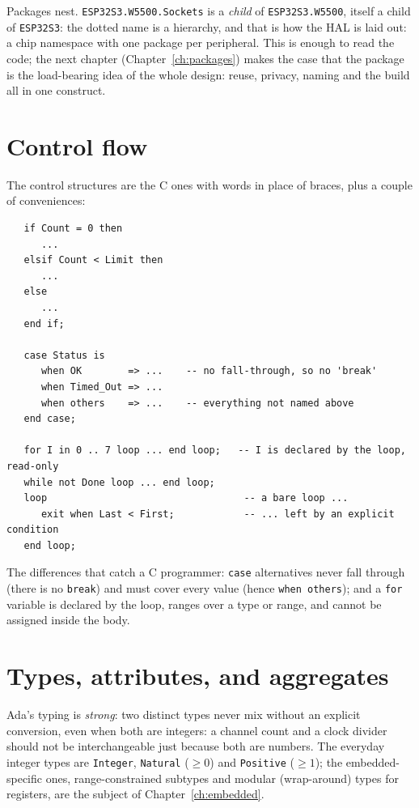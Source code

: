 Packages nest. \texttt{ESP32S3.W5500.Sockets} is a \emph{child} of
\texttt{ESP32S3.W5500}, itself a child of \texttt{ESP32S3}: the dotted name is a
hierarchy, and that is how the HAL is laid out: a chip namespace with one package
per peripheral. This is enough to read the code; the next chapter
(Chapter~\ref{ch:packages}) makes the case that the package is the load-bearing idea
of the whole design: reuse, privacy, naming and the build all in one construct.

\section{Control flow}

The control structures are the C ones with words in place of braces, plus a couple
of conveniences:

\begin{lstlisting}
   if Count = 0 then
      ...
   elsif Count < Limit then
      ...
   else
      ...
   end if;

   case Status is
      when OK        => ...    -- no fall-through, so no 'break'
      when Timed_Out => ...
      when others    => ...    -- everything not named above
   end case;

   for I in 0 .. 7 loop ... end loop;   -- I is declared by the loop, read-only
   while not Done loop ... end loop;
   loop                                  -- a bare loop ...
      exit when Last < First;            -- ... left by an explicit condition
   end loop;
\end{lstlisting}

The differences that catch a C programmer: \texttt{case} alternatives never fall
through (there is no \texttt{break}) and must cover every value (hence
\texttt{when others}); and a \texttt{for} variable is declared by the loop, ranges
over a type or range, and cannot be assigned inside the body.

\section{Types, attributes, and aggregates}

Ada's typing is \emph{strong}: two distinct types never mix without an explicit
conversion, even when both are integers: a channel count and a clock divider
should not be interchangeable just because both are numbers. The everyday integer
types are \texttt{Integer}, \texttt{Natural} ($\geq 0$) and \texttt{Positive}
($\geq 1$); the embedded-specific ones, range-constrained subtypes and modular
(wrap-around) types for registers, are the subject of Chapter~\ref{ch:embedded}.

